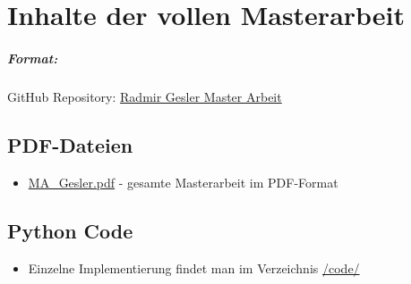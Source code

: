 \chapter{Inhalte der vollen Masterarbeit}
\label{app:cdrom}

\paragraph{Format:} 
		GitHub Repository: \href{https://github.com/RadmirG/Master-Arbeit}{Radmir Gesler Master Arbeit}


\section{PDF-Dateien}
\begin{itemize}
	\item \href{https://github.com/RadmirG/Master-Arbeit/blob/master/MA_latex/MA_Gesler.pdf}{MA\_Gesler.pdf} - gesamte Masterarbeit im PDF-Format 
\end{itemize}


\section{Python Code}

\begin{itemize}
	
	\item Einzelne Implementierung findet man im Verzeichnis \href{https://github.com/RadmirG/Master-Arbeit/tree/master/code/DeapXDE_heat_equa}{/code/}

\end{itemize}